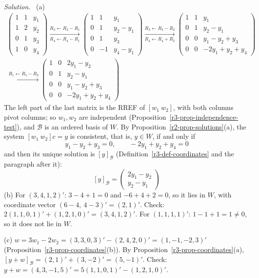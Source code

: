 \documentclass[12pt]{article}
\theoremstyle{definition}
\newenvironment{solution}{\par\noindent\textit{Solution.}\ }{\par\smallskip}
\begin{document}
\begin{solution}
(a)
\[
\begin{gathered}
\left(\begin{array}{cc|c}1&1&y_1\\1&2&y_2\\0&1&y_3\\1&0&y_4\end{array}\right)
\xrightarrow[R_4\leftarrow R_4-R_1]{R_2\leftarrow R_2-R_1}
\left(\begin{array}{cc|c}1&1&y_1\\0&1&y_2-y_1\\0&1&y_3\\0&-1&y_4-y_1\end{array}\right)
\xrightarrow[R_4\leftarrow R_4+R_2]{R_3\leftarrow R_3-R_2}
\left(\begin{array}{cc|c}1&1&y_1\\0&1&y_2-y_1\\0&0&y_1-y_2+y_3\\0&0&-2y_1+y_2+y_4\end{array}\right)
\\
\xrightarrow{R_1\leftarrow R_1-R_2}
\left(\begin{array}{cc|c}1&0&2y_1-y_2\\0&1&y_2-y_1\\0&0&y_1-y_2+y_3\\0&0&-2y_1+y_2+y_4\end{array}\right)
\end{gathered}
\]
The left part of the last matrix is the RREF of \([w_1\ w_2]\), with both columns pivot columns; so
\(w_1,w_2\) are independent (Proposition~\ref{r3-prop-independence-test}), and \(\mathcal B\) is an
ordered basis of \(W\). By Proposition~\ref{r2-prop-solutions}(a), the system \([w_1\ w_2]c=y\) is
consistent, that is, \(y\in W\), if and only if
\[
y_1-y_2+y_3=0,\qquad -2y_1+y_2+y_4=0
\]
and then its unique solution is \([y]_{\mathcal B}\) (Definition~\ref{r3-def-coordinates} and the
paragraph after it):
\[
[y]_{\mathcal B}=\begin{pmatrix}2y_1-y_2\\y_2-y_1\end{pmatrix}
\]
(b) For \((3,4,1,2)'\): \(3-4+1=0\) and \(-6+4+2=0\), so it lies in \(W\), with coordinate vector
\((6-4,\ 4-3)'=(2,1)'\). Check: \(2(1,1,0,1)'+(1,2,1,0)'=(3,4,1,2)'\). For \((1,1,1,1)'\):
\(1-1+1=1\ne0\), so it does not lie in \(W\).

(c) \(w=3w_1-2w_2=(3,3,0,3)'-(2,4,2,0)'=(1,-1,-2,3)'\) (Proposition~\ref{r3-prop-coordinates}(b)). By
Proposition~\ref{r3-prop-coordinates}(a), \([y+w]_{\mathcal B}=(2,1)'+(3,-2)'=(5,-1)'\). Check:
\(y+w=(4,3,-1,5)'=5(1,1,0,1)'-(1,2,1,0)'\).
\end{solution}
\end{document}
